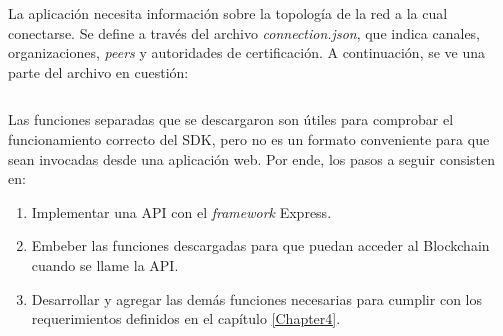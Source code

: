 La aplicación necesita información sobre la topología de la red a la cual conectarse. Se define a través del archivo \textit{connection.json}, que indica canales, organizaciones, \textit{peers} y autoridades de certificación. A continuación, se ve una parte del archivo en cuestión:
\inputminted[linenos, breakanywhere=true, breaklines, bgcolor=mygray, firstline=16, lastline=40]{json}{Listings/connection.json}

Las funciones separadas que se descargaron son útiles para comprobar el funcionamiento correcto del SDK, pero no es un formato conveniente para que sean invocadas desde una aplicación web. Por ende, los pasos a seguir consisten en:
\begin{enumerate}
    \item Implementar una API con el \textit{framework} Express.
    \item Embeber las funciones descargadas para que puedan acceder al Blockchain cuando se llame la API.
    \item Desarrollar y agregar las demás funciones necesarias para cumplir con los requerimientos definidos en el capítulo \ref{Chapter4}.
\end{enumerate}

